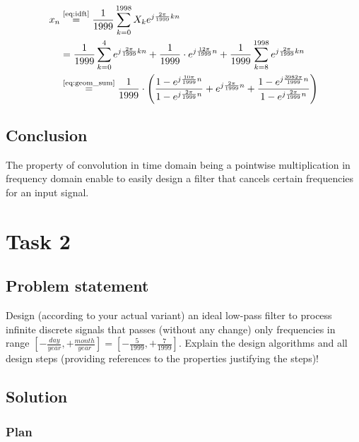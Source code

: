 \documentclass[a4paper]{article}
\theoremstyle{break}
\theoremstyle{break}
\begin{document}
\begin{equation*}
  \begin{split}
    x_n &\stackrel{\text{\eqref{eq:idft}}}{=} \frac{1}{1999} \sum_{k=0}^{1998} X_k e^{j \frac{2 \pi }{1999} k n} \\
        &= \frac{1}{1999} \sum_{k=0}^{4} e^{j \frac{2 \pi }{1999} k n} + \frac{1}{1999} \cdot e^{j \frac{12 \pi }{1999} n} + \frac{1}{1999} \sum_{k=8}^{1998} e^{j \frac{2 \pi }{1999} k n} \\
        &\stackrel{\text{\eqref{eq:geom_sum}}}{=} \frac{1}{1999} \cdot \left( \frac{1 - e^{j \frac{10 \pi}{1999} n}}{1 - e^{j \frac{2 \pi}{1999} n}} + e^{j \frac{2 \pi}{1999} n} + \frac{1 - e^{j \frac{3982 \pi}{1999} n}}{1 - e^{j \frac{2 \pi}{1999} n}} \right)
  \end{split}
\end{equation*}

\subsection*{Conclusion}

The property of convolution in time domain being a pointwise multiplication in frequency domain enable to easily design a filter that cancels certain frequencies for an input signal.

\clearpage
\section{Task 2}

\subsection*{Problem statement}

Design (according to your actual variant) an ideal low-pass filter to process infinite discrete signals that passes (without any change) only frequencies in range $\left[ -\frac{day}{year}, + \frac{month}{year} \right] = \left[ -\frac{5}{1999}, + \frac{7}{1999} \right]$. Explain the design algorithms and all design steps (providing references to the properties justifying the steps)!

\subsection*{Solution}

\subsubsection*{Plan}
\end{document}
